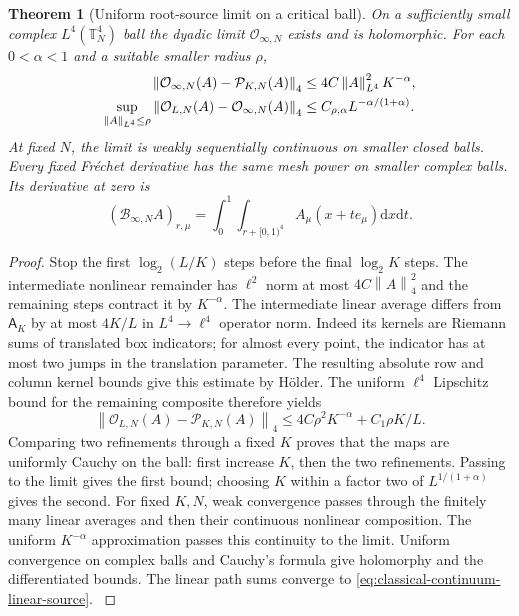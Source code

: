 \documentclass[11pt,oneside,openany]{book}
\newtheorem{theorem}{Theorem}[chapter]
\theoremstyle{definition}
\theoremstyle{remark}
\newcommand{\T}{\mathbb T}
\newcommand{\dd}{\mathrm d}
\newcommand{\norm}[1]{\left\lVert#1\right\rVert}
\newcommand{\src}[2]{\cite[#2]{#1}}
\begin{document}
\begin{theorem}[Uniform root-source limit on a critical ball]
\label{thm:classical-weak-source}
On a sufficiently small complex $L^4(\T_N^4)$ ball the dyadic limit
$\mathcal O_{\infty,N}$ exists and is holomorphic. For each
$0<\alpha<1$ and a suitable smaller radius $\rho$,
\begin{align}
 \norm{\mathcal O_{\infty,N}(A)-\mathcal P_{K,N}(A)}_4
      &\le4C\norm A_{L^4}^2K^{-\alpha},\notag\\
 \sup_{\norm A_{L^4}\le\rho}
 \norm{\mathcal O_{L,N}(A)-\mathcal O_{\infty,N}(A)}_4
      &\le C_{\rho,\alpha}L^{-\alpha/(1+\alpha)}.
 \label{eq:classical-source-limit}
\end{align}
At fixed $N$, the limit is weakly sequentially continuous on smaller
closed balls. Every fixed Fr\'echet derivative has the same mesh
power on smaller complex balls. Its derivative at zero is
\begin{equation}
 (\mathcal B_{\infty,N}A)_{r,\mu}
       =\int_0^1\int_{r+[0,1)^4}A_\mu(x+t e_\mu)\dd x\dd t.
 \label{eq:classical-continuum-linear-source}
\end{equation}
\end{theorem}
\begin{proof}
Stop the first $\log_2(L/K)$ steps before the final $\log_2K$
steps. The intermediate nonlinear remainder has $\ell^2$ norm at
most $4C\norm A_4^2$ and the remaining steps contract it by
$K^{-\alpha}$. The intermediate linear average differs from
$\mathsf A_K$ by at most $4K/L$ in $L^4\to\ell^4$ operator norm.
Indeed its kernels are Riemann sums of translated box indicators;
for almost every point, the indicator has at most two jumps in the
translation parameter. The resulting absolute row and column kernel
bounds give this estimate by H\"older. The uniform $\ell^4$
Lipschitz bound for the remaining composite therefore yields
\[
 \norm{\mathcal O_{L,N}(A)-\mathcal P_{K,N}(A)}_4
 \le4C\rho^2K^{-\alpha}+C_1\rho K/L.
\]
Comparing two refinements through a fixed $K$ proves that the maps
are uniformly Cauchy on the ball: first increase $K$, then the two
refinements. Passing to the limit gives the first bound; choosing
$K$ within a factor two of $L^{1/(1+\alpha)}$ gives the second.
For fixed $K,N$, weak convergence passes through the finitely many
linear averages and then their continuous nonlinear composition.
The uniform $K^{-\alpha}$ approximation passes this continuity to
the limit. Uniform convergence on complex balls and Cauchy's formula
give holomorphy and the differentiated bounds. The linear path sums
converge to \cref{eq:classical-continuum-linear-source}.
\src{SM}{V12--V13}
\end{proof}
\end{document}
